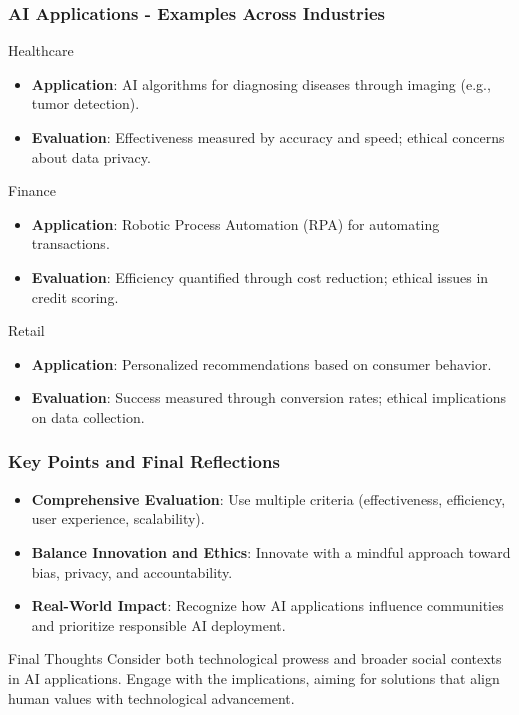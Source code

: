 \documentclass[aspectratio=169]{beamer}
\begin{document}
\begin{frame}[fragile]
    \frametitle{AI Applications - Examples Across Industries}
    \begin{block}{Healthcare}
        \begin{itemize}
            \item \textbf{Application}: AI algorithms for diagnosing diseases through imaging (e.g., tumor detection).
            \item \textbf{Evaluation}: Effectiveness measured by accuracy and speed; ethical concerns about data privacy.
        \end{itemize}
    \end{block}

    \begin{block}{Finance}
        \begin{itemize}
            \item \textbf{Application}: Robotic Process Automation (RPA) for automating transactions.
            \item \textbf{Evaluation}: Efficiency quantified through cost reduction; ethical issues in credit scoring.
        \end{itemize}
    \end{block}

    \begin{block}{Retail}
        \begin{itemize}
            \item \textbf{Application}: Personalized recommendations based on consumer behavior.
            \item \textbf{Evaluation}: Success measured through conversion rates; ethical implications on data collection.
        \end{itemize}
    \end{block}
\end{frame}

\begin{frame}[fragile]
    \frametitle{Key Points and Final Reflections}
    \begin{itemize}
        \item \textbf{Comprehensive Evaluation}: Use multiple criteria (effectiveness, efficiency, user experience, scalability).
        \item \textbf{Balance Innovation and Ethics}: Innovate with a mindful approach toward bias, privacy, and accountability.
        \item \textbf{Real-World Impact}: Recognize how AI applications influence communities and prioritize responsible AI deployment.
    \end{itemize}

    \begin{block}{Final Thoughts}
        Consider both technological prowess and broader social contexts in AI applications. Engage with the implications, aiming for solutions that align human values with technological advancement.
    \end{block}
\end{frame}
\end{document}
